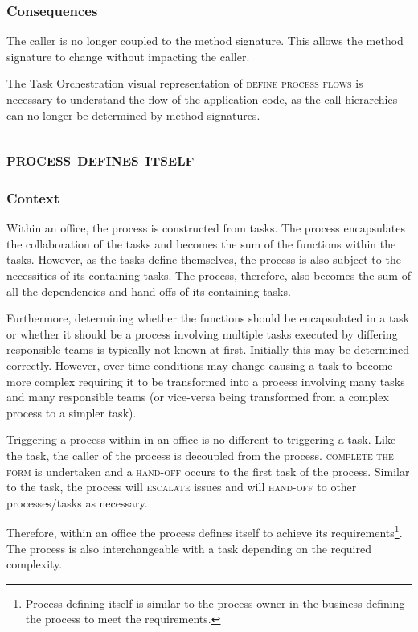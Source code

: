 \documentclass[prodmode]{style/acmlarge}
\begin{document}
\subsubsection*{Consequences} The caller is no longer coupled to the method
signature.  This allows the method signature to change without impacting the
caller.

The Task Orchestration visual representation of \textsc{define process flows} is
necessary to understand the flow of the application code, as the call
hierarchies can no longer be determined by method signatures.



\subsection{\textsc{\textbf{process defines itself}}}

\subsubsection*{Context} Within an office, the process is constructed from
tasks.  The process encapsulates the collaboration of the tasks and becomes the
sum of the functions within the tasks.  However, as the tasks define themselves,
the process is also subject to the necessities of its containing tasks.  The
process, therefore, also becomes the sum of all the dependencies and hand-offs
of its containing tasks.

Furthermore, determining whether the functions should be encapsulated in a task
or whether it should be a process involving multiple tasks executed by differing
responsible teams is typically not known at first.  Initially this may be
determined correctly.  However, over time conditions may change causing a
task to become more complex requiring it to be transformed into a process
involving many tasks and many responsible teams (or vice-versa being transformed
from a complex process to a simpler task).

Triggering a process within in an office is no different to triggering a task.
Like the task, the caller of the process is decoupled from the process.
\textsc{complete the form} is undertaken and a \textsc{hand-off} occurs to the
first task of the process.  Similar to the task, the process will
\textsc{escalate} issues and will \textsc{hand-off} to other processes/tasks as
necessary.

Therefore, within an office the process defines itself to achieve its
requirements\footnote{Process defining itself is similar to the process owner in
the business defining the process to meet the requirements.}.  The process is
also interchangeable with a task depending on the required complexity.
\end{document}
